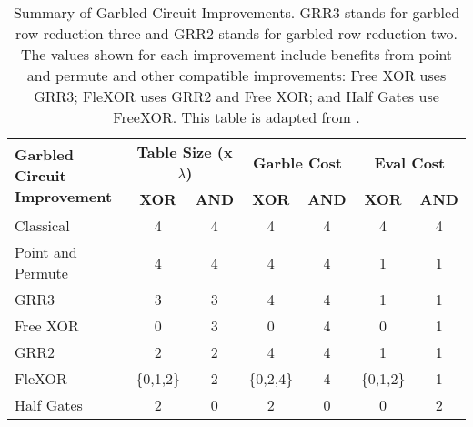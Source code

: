 \begin{table}[t]
    \centering
    \renewcommand{\arraystretch}{1.2}
    \normalsize
    \begin{adjustbox}{width=1\textwidth}
        \begin{tabular}{|p{5cm}|c|c|c|c|c|c|}
            \hline
            \multirow{2}{5cm}{\centering \textbf{Garbled Circuit Improvement}} & 
            \multicolumn{2}{c|}{\textbf{Table Size (x$\lambda$)}} & 
            \multicolumn{2}{c|}{\textbf{Garble Cost}} & 
            \multicolumn{2}{c|}{\textbf{Eval Cost}} \\
            \cline{2-7}
            & \textbf{XOR} & \textbf{AND} & \textbf{XOR} & \textbf{AND}  & \textbf{XOR} & \textbf{AND} \\
            \hline
            Classical & 4 & 4 & 4 & 4 & 4 & 4 \\ \hline
            Point and Permute & 4 & 4 & 4 & 4 & 1 & 1 \\ \hline
            GRR3 & 3 & 3 & 4 & 4  & 1 & 1 \\ \hline
            Free XOR & 0 & 3 & 0 & 4 & 0 & 1  \\ \hline
            GRR2  & 2 & 2 & 4 & 4 & 1 & 1  \\ \hline
            FleXOR & \{0,1,2\} & 2 & \{0,2,4\} & 4 & \{0,1,2\} & 1  \\ \hline
            Half Gates & 2 & 0 & 2 & 0 & 0 & 2  \\ \hline
        \end{tabular}
    \end{adjustbox}
    \caption[Summary of garbled circuit improvements]{Summary of Garbled Circuit Improvements. 
    GRR3 stands for garbled row reduction three and GRR2 stands for garbled row reduction two. 
    The values shown for each improvement include benefits from point and permute and other compatible improvements: 
    Free XOR uses GRR3; FleXOR uses GRR2 and Free XOR; and Half Gates use FreeXOR.
    This table is adapted from \cite{twohalves}.}
    \label{tbl:improvements}
\end{table}


